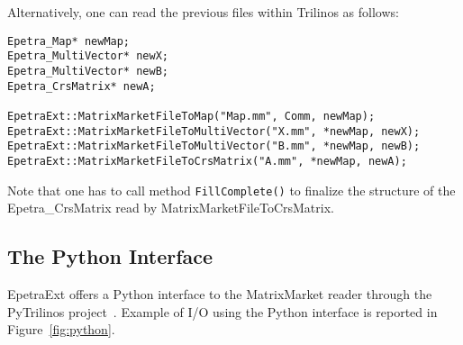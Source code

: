 \documentclass[11pt,relax]{SANDreport}
\begin{document}
Alternatively, one can read the
previous files within Trilinos as follows:
\begin{verbatim}
Epetra_Map* newMap;
Epetra_MultiVector* newX;
Epetra_MultiVector* newB;
Epetra_CrsMatrix* newA;

EpetraExt::MatrixMarketFileToMap("Map.mm", Comm, newMap);
EpetraExt::MatrixMarketFileToMultiVector("X.mm", *newMap, newX);
EpetraExt::MatrixMarketFileToMultiVector("B.mm", *newMap, newB);
EpetraExt::MatrixMarketFileToCrsMatrix("A.mm", *newMap, newA);
\end{verbatim}
Note that one has to call method {\tt FillComplete()} to finalize the
structure of the Epetra\_CrsMatrix read by MatrixMarketFileToCrsMatrix.

\subsection{The Python Interface}
\label{sec:mm:python}

EpetraExt offers a Python interface to the MatrixMarket reader through the
PyTrilinos project~\cite{pytrilinos-la-guide,sala05pytrilinos}.  Example of
I/O using the Python interface is reported in Figure~\ref{fig:python}.
\end{document}
